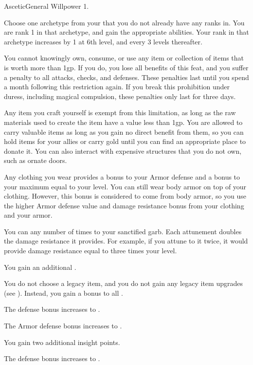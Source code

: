   \begin{feat}{Ascetic}{General}
    \featpre Willpower 1.

     Choose one archetype from your  that you do not already have any
    ranks in.
    You are rank 1 in that archetype, and gain the appropriate abilities.
    Your rank in that archetype increases by 1 at 6th level, and every 3 levels thereafter.

     You cannot knowingly own, consume, or use any item or collection of items that is worth more than 1gp.
    If you do, you lose all benefits of this feat, and you suffer a  penalty to all attacks, checks, and defenses.
    These penalties last until you spend a month following this restriction again.
    If you break this prohibition under duress, including magical compulsion, these penalties only last for three days.

    Any item you craft yourself is exempt from this limitation, as long as the raw materials used to create the item have a value less than 1gp.
    You are allowed to carry valuable items as long as you gain no direct benefit from them, so you can hold items for your allies or carry gold until you can find an appropriate place to donate it.
    You can also interact with expensive structures that you do not own, such as ornate doors.

     Any clothing you wear provides a  bonus to your Armor defense and a bonus to your maximum  equal to your level.
    You can still wear body armor on top of your clothing.
    However, this bonus is considered to come from body armor, so you use the higher Armor defense value and damage resistance bonus from your clothing and your armor.

    You can  any number of times to your sanctified garb.
    Each attunement doubles the damage resistance it provides.
    For example, if you attune to it twice, it would provide damage resistance equal to three times your level.

     You gain an additional .

     You do not choose a legacy item, and you do not gain any legacy item upgrades (see ).
    Instead, you gain a  bonus to all .

     The defense bonus increases to .

     The Armor defense bonus increases to .

     You gain two additional insight points.

     The defense bonus increases to .
  \end{feat}

